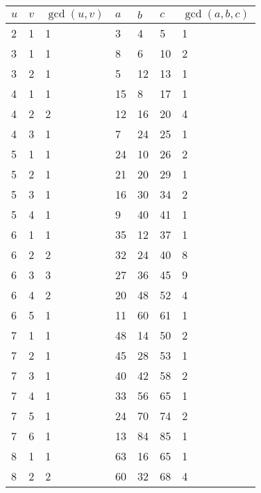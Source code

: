 \documentclass[letterpaper, 12pt]{memoir}
\theoremstyle{mystyle}
\begin{document}
\begin{tabular}{|l l l|l l l l|}
    \hline
    $u$ & $v$ & $\gcd (u, v)$  & $a$   & $b$   & $c$ & $\gcd(a,b,c)$  \\
    \hline
    2 & 1 & 1 & 3 & 4 & 5 & 1 \\
    3 & 1 & 1 & 8 & 6 & 10 & 2 \\
    3 & 2 & 1 & 5 & 12 & 13 & 1 \\
    4 & 1 & 1 & 15 & 8 & 17 & 1 \\
    4 & 2 & 2 & 12 & 16 & 20 & 4 \\
    4 & 3 & 1 & 7 & 24 & 25 & 1 \\
    5 & 1 & 1 & 24 & 10 & 26 & 2 \\
    5 & 2 & 1 & 21 & 20 & 29 & 1 \\
    5 & 3 & 1 & 16 & 30 & 34 & 2 \\
    5 & 4 & 1 & 9 & 40 & 41 & 1 \\
    6 & 1 & 1 & 35 & 12 & 37 & 1 \\
    6 & 2 & 2 & 32 & 24 & 40 & 8 \\
    6 & 3 & 3 & 27 & 36 & 45 & 9 \\
    6 & 4 & 2 & 20 & 48 & 52 & 4 \\
    6 & 5 & 1 & 11 & 60 & 61 & 1 \\
    7 & 1 & 1 & 48 & 14 & 50 & 2 \\
    7 & 2 & 1 & 45 & 28 & 53 & 1 \\
    7 & 3 & 1 & 40 & 42 & 58 & 2 \\
    7 & 4 & 1 & 33 & 56 & 65 & 1 \\
    7 & 5 & 1 & 24 & 70 & 74 & 2 \\
    7 & 6 & 1 & 13 & 84 & 85 & 1 \\
    8 & 1 & 1 & 63 & 16 & 65 & 1 \\
    8 & 2 & 2 & 60 & 32 & 68 & 4 \\
    \hline
\end{tabular}
\quad    
\end{document}
